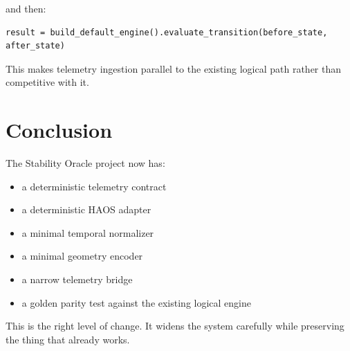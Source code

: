 \documentclass[11pt]{article}
\begin{document}
and then:

\begin{verbatim}
result = build_default_engine().evaluate_transition(before_state, after_state)
\end{verbatim}

This makes telemetry ingestion parallel to the existing logical path rather than competitive with it.

\section{Conclusion}

The Stability Oracle project now has:

\begin{itemize}
\item a deterministic telemetry contract
\item a deterministic HAOS adapter
\item a minimal temporal normalizer
\item a minimal geometry encoder
\item a narrow telemetry bridge
\item a golden parity test against the existing logical engine
\end{itemize}

This is the right level of change.
It widens the system carefully while preserving the thing that already works.
\end{document}
